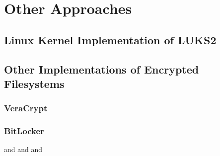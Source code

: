 \section{Other Approaches}

\subsection{Linux Kernel Implementation of LUKS2}

\subsection{Other Implementations of Encrypted Filesystems}

\subsubsection{VeraCrypt}

\subsubsection{BitLocker}
\cite{Kornblum2009} and \cite{Lewis2018} and \cite{Tuerpe2009} and \cite{Tan2020}